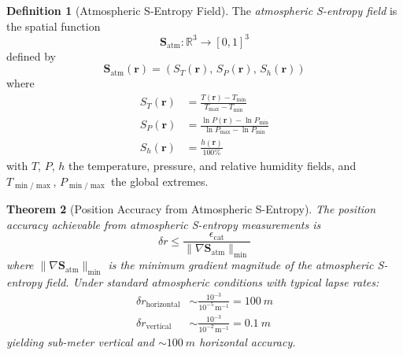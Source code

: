 \documentclass[twocolumn,10pt]{article}
\newtheorem{theorem}{Theorem}[section]
\theoremstyle{definition}
\newtheorem{definition}[theorem]{Definition}
\theoremstyle{remark}
\newcommand{\Sent}{\mathbf{S}}
\newcommand{\R}{\mathbb{R}}
\begin{document}
\begin{definition}[Atmospheric S-Entropy Field]\label{def:atm-field}
The \emph{atmospheric S-entropy field} is the spatial function
\begin{equation}\label{eq:atm-field}
  \Sent_{\mathrm{atm}}: \R^3 \to [0,1]^3
\end{equation}
defined by
\begin{equation}\label{eq:atm-field-def}
  \Sent_{\mathrm{atm}}(\mathbf{r}) = \left(
    S_T(\mathbf{r}), \, S_P(\mathbf{r}), \, S_h(\mathbf{r})
  \right)
\end{equation}
where
\begin{align}
  S_T(\mathbf{r}) &= \frac{T(\mathbf{r}) - T_{\min}}{T_{\max} - T_{\min}}
    \label{eq:st-def} \\
  S_P(\mathbf{r}) &= \frac{\ln P(\mathbf{r}) - \ln P_{\min}}
    {\ln P_{\max} - \ln P_{\min}} \label{eq:sp-def} \\
  S_h(\mathbf{r}) &= \frac{h(\mathbf{r})}{100\%} \label{eq:sh-def}
\end{align}
with $T$, $P$, $h$ the temperature, pressure, and relative humidity fields,
and $T_{\min/\max}$, $P_{\min/\max}$ the global extremes.
\end{definition}

\begin{theorem}[Position Accuracy from Atmospheric S-Entropy]\label{thm:position-accuracy}
The position accuracy achievable from atmospheric S-entropy measurements is
\begin{equation}\label{eq:position-accuracy}
  \delta r \leq \frac{\epsilon_{\mathrm{cat}}}
    {\|\nabla \Sent_{\mathrm{atm}}\|_{\min}}
\end{equation}
where $\|\nabla \Sent_{\mathrm{atm}}\|_{\min}$ is the minimum gradient
magnitude of the atmospheric S-entropy field. Under standard atmospheric
conditions with typical lapse rates:
\begin{align}
  \delta r_{\mathrm{horizontal}} &\sim \frac{10^{-3}}{10^{-5}\,
    \mathrm{m}^{-1}} = \SI{100}{m} \label{eq:horiz-accuracy} \\
  \delta r_{\mathrm{vertical}} &\sim \frac{10^{-3}}{10^{-2}\,
    \mathrm{m}^{-1}} = \SI{0.1}{m} \label{eq:vert-accuracy}
\end{align}
yielding sub-meter vertical and $\sim\!\SI{100}{m}$ horizontal accuracy.
\end{theorem}
\end{document}
